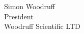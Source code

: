 \documentclass[english,aps]{article}
\begin{document}



Simon Woodruff \\

President \\

Woodruff Scientific LTD
\newpage
\tableofcontents
\newpage 
%

\newpage 

%
% 

% 
% 
% 
% 
% 
% 
% 
% 
% 
% 
% 
% 
% 
% 
% 
% 
% 
% 
% 
% 
% 
% 
% 
% 
% 
% 
% 
% 
% 
% 
% 
\end{document}
